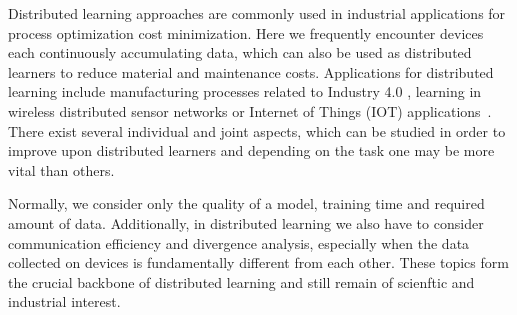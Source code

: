 

Distributed learning approaches are commonly used in industrial applications for process optimization cost minimization. 
Here we frequently encounter devices each continuously accumulating data, which can also be used as distributed learners to reduce material and maintenance costs.
Applications for distributed learning include manufacturing processes related to Industry 4.0 \cite{kreitlein2015green}\cite{guglielmino2001moving}\cite{faller2015industry}, learning in wireless distributed sensor networks \cite{maleki2010energy}\cite{predd2006distributed} or Internet of Things (IOT) applications~\cite{roman2013features}.
There exist several individual and joint aspects, which can be studied in order to improve upon distributed learners and depending on the task one may be more vital than others.

Normally, we consider only the quality of a model, training time and required amount of data. 
Additionally, in distributed learning we also have to consider communication efficiency and divergence analysis, especially when the data collected on devices is fundamentally different from each other.
These topics form the crucial backbone of distributed learning and still remain of scienftic and industrial interest.

